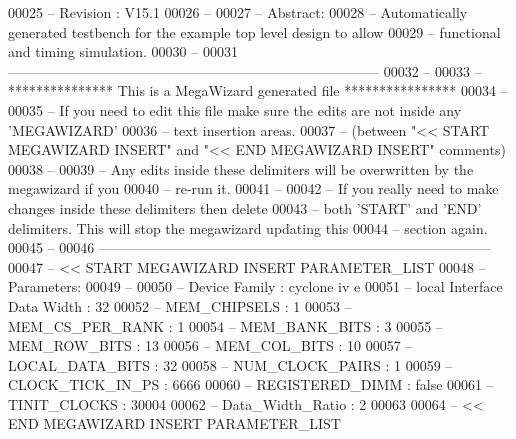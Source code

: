 \begin{DoxyCode}
00025 \textcolor{keyword}{-- Revision     : V15.1}
00026 \textcolor{keyword}{--}
00027 \textcolor{keyword}{-- Abstract:}
00028 \textcolor{keyword}{-- Automatically generated testbench for the example top level design to allow}
00029 \textcolor{keyword}{-- functional and timing simulation.}
00030 \textcolor{keyword}{--}
00031 \textcolor{keyword}{--------------------------------------------------------------------------------}
00032 \textcolor{keyword}{--}
00033 \textcolor{keyword}{-- *************** This is a MegaWizard generated file ****************}
00034 \textcolor{keyword}{--}
00035 \textcolor{keyword}{-- If you need to edit this file make sure the edits are not inside any 'MEGAWIZARD'}
00036 \textcolor{keyword}{-- text insertion areas.}
00037 \textcolor{keyword}{-- (between "<< START MEGAWIZARD INSERT" and "<< END MEGAWIZARD INSERT" comments)}
00038 \textcolor{keyword}{--}
00039 \textcolor{keyword}{-- Any edits inside these delimiters will be overwritten by the megawizard if you}
00040 \textcolor{keyword}{-- re-run it.}
00041 \textcolor{keyword}{--}
00042 \textcolor{keyword}{-- If you really need to make changes inside these delimiters then delete}
00043 \textcolor{keyword}{-- both 'START' and 'END' delimiters.  This will stop the megawizard updating this}
00044 \textcolor{keyword}{-- section again.}
00045 \textcolor{keyword}{--}
00046 \textcolor{keyword}{------------------------------------------------------------------------------------}
00047 \textcolor{keyword}{-- << START MEGAWIZARD INSERT PARAMETER\_LIST}
00048 \textcolor{keyword}{-- Parameters:}
00049 \textcolor{keyword}{--}
00050 \textcolor{keyword}{-- Device Family                      : cyclone iv e}
00051 \textcolor{keyword}{-- local Interface Data Width         : 32}
00052 \textcolor{keyword}{-- MEM\_CHIPSELS                       : 1}
00053 \textcolor{keyword}{-- MEM\_CS\_PER\_RANK                    : 1}
00054 \textcolor{keyword}{-- MEM\_BANK\_BITS                      : 3}
00055 \textcolor{keyword}{-- MEM\_ROW\_BITS                       : 13}
00056 \textcolor{keyword}{-- MEM\_COL\_BITS                       : 10}
00057 \textcolor{keyword}{-- LOCAL\_DATA\_BITS                    : 32}
00058 \textcolor{keyword}{-- NUM\_CLOCK\_PAIRS                    : 1}
00059 \textcolor{keyword}{-- CLOCK\_TICK\_IN\_PS                   : 6666}
00060 \textcolor{keyword}{-- REGISTERED\_DIMM                    : false}
00061 \textcolor{keyword}{-- TINIT\_CLOCKS                       : 30004}
00062 \textcolor{keyword}{-- Data\_Width\_Ratio                   : 2}
00063 
00064 \textcolor{keyword}{-- << END MEGAWIZARD INSERT PARAMETER\_LIST}

\end{DoxyCode}
